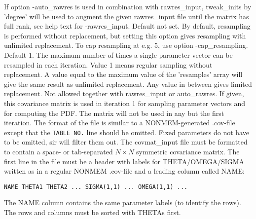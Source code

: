 \begin{optionlist}
If option -auto\_rawres is used
in combination with rawres\_input, tweak\_inits by 'degree' will be used 
to augment the given rawres\_input file until the matrix has full rank, see help text for -rawres\_input.
\nextopt
{}
Default not set. By default, resampling is performed without replacement, but setting this option gives resampling 
with unlimited replacement.
To cap resampling at e.g. 5, use option -cap\_resampling.
\nextopt
{}
Default 1. The maximum number of times a single parameter vector can be resampled in each iteration. 
Value 1 means regular sampling without replacement. 
A value equal to the maximum value of the 'resamples' array will give the same
result as unlimited replacement. Any value in between gives limited replacement. 
\nextopt
{}
Not allowed together with rawres\_input or auto\_rawres. If given, this covariance matrix is
used in iteration 1
for sampling parameter vectors and for computing the PDF.
The matrix will not be used in any but the first iteration. 
The format of the file is similar to a NONMEM-generated .cov-file except 
that the \verb|TABLE NO.| line should be omitted.
Fixed parameters do not have to be omitted, sir will filter them out. 
The covmat\_input file must be formatted to contain a space- or tab-separated  $N\times N$ symmetric covariance matrix.
The first line in the file must be a header with labels for THETA/OMEGA/SIGMA written as in a regular NONMEM .cov-file 
and a leading column called NAME: 
\begin{verbatim}
NAME THETA1 THETA2 ... SIGMA(1,1) ... OMEGA(1,1) ... 
\end{verbatim}
The NAME column contains the same parameter labels (to identify the rows).
The rows and columns must be sorted with THETAs first.


\end{optionlist}
